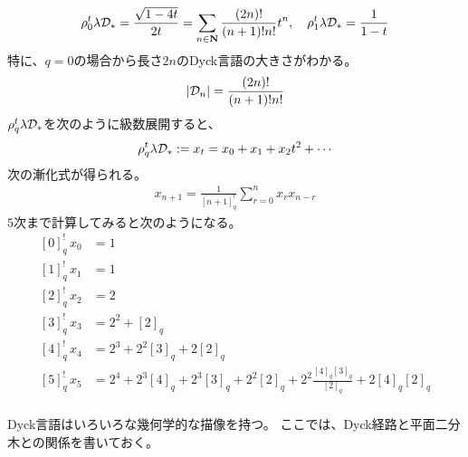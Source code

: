 {	\begin{equation*}\begin{split}
		\rho^t_0\lambda{\ensuremath{{\mathcal{D}}}}_* = \frac{\sqrt{1-4t}}{2t} 
			= \sum_{n\in\mathbf{N}} \frac{(2n)!}{(n+1)!n!}t^n,\quad
		\rho^t_1\lambda{\ensuremath{{\mathcal{D}}}}_* = \frac{1}{1-t}
	\end{split}\end{equation*}
	特に、$q=0$の場合から長さ$2n$のDyck言語の大きさがわかる。
	\begin{equation*}\begin{split}
		|{{\mathcal{D}}}_n| = \frac{(2n)!}{(n+1)!n!}
	\end{split}\end{equation*}
	$\rho^t_q\lambda{\ensuremath{{\mathcal{D}}}}_*$を次のように級数展開すると、
	\begin{equation*}\begin{split}
		\rho^t_q\lambda{\ensuremath{{\mathcal{D}}}}_* := x_t = x_0 + x_1 + x_2t^2 + \cdots
	\end{split}\end{equation*}
	次の漸化式が得られる。
	\begin{equation*}\begin{split}
		x_{n+1} = \frac{1}{[n+1]_q^!}\sum_{r=0}^n x_rx_{n-r}
	\end{split}\end{equation*}
	$5$次まで計算してみると次のようになる。
	\begin{equation*}\begin{split}
		[0]_q^!\, x_0 &= 1 \\
		[1]_q^!\, x_1 &= 1 \\
		[2]_q^!\, x_2 &= 2 \\
		[3]_q^!\, x_3 &= 2^2 + [2]_q \\
		[4]_q^!\, x_4 &= 2^3 + 2^2[3]_q + 2[2]_q \\
		[5]_q^!\, x_5 &= 2^4 + 2^3[4]_q + 2^3[3]_q + 2^2[2]_q 
			+ 2^2\frac{[4]_q[3]_q}{[2]_q} + 2[4]_q[2]_q \\
	\end{split}\end{equation*}

	Dyck言語はいろいろな幾何学的な描像を持つ。
	ここでは、Dyck経路と平面二分木との関係を書いておく。

}
